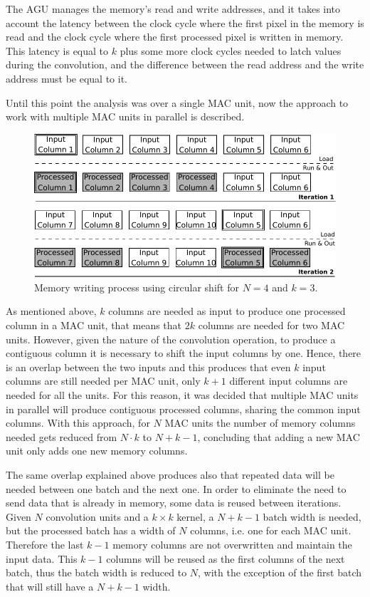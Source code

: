 \documentclass[conference,compsoc]{IEEEtran}
\begin{document}
The AGU manages the memory's read and write addresses, and it takes into account the
latency between the clock cycle where the first pixel in the memory is read and
the clock cycle where the first processed pixel is written in memory. This latency is
equal to $k$ plus some more clock cycles needed to latch values during the
convolution, and the difference between the read address and the write address
must be equal to it.

Until this point the analysis was over a single MAC unit, now the
approach to work with multiple MAC units in parallel is
described.

\begin{figure}[!t]
\centering
\includegraphics[scale=0.55]{algorithm}
\caption{Memory writing process using circular shift for $N = 4$ and $k = 3$.}
\label{algorithm}
\end{figure}

As mentioned above, $k$ columns are needed as input to produce one processed
column in a MAC unit, that means that $2k$ columns are needed for two
MAC units. However, given the nature of the convolution operation, to
produce a contiguous column it is necessary to shift the input columns by one.
Hence, there is an overlap between the two inputs and this produces that even $k$ input columns are still needed per MAC unit, only
$k+1$ different input columns are needed for all the units. For this reason, it was decided that
multiple MAC units in parallel will produce contiguous processed
columns, sharing the common input columns. With this approach, for $N$
MAC units the number of memory columns needed gets reduced from $N\cdot
k$ to $N+k-1$, concluding that adding a new MAC unit only adds one new
memory columns.

The same overlap explained above produces also that repeated data will be needed
between one batch and the next one. In order to eliminate the need to send data
that is already in memory, some data is reused between iterations. Given $N$ convolution
units and a $k\times k$ kernel, a $N+k-1$ batch width is needed, but the
processed batch has a width of $N$ columns, i.e. one for each MAC unit. 
Therefore the last $k-1$ memory columns are not overwritten and maintain the
input data. This $k-1$ columns will be reused as the first columns of the 
next batch, thus the batch width is reduced to $N$, with the exception of
the first batch that will still have a $N+k-1$ width.
\end{document}
